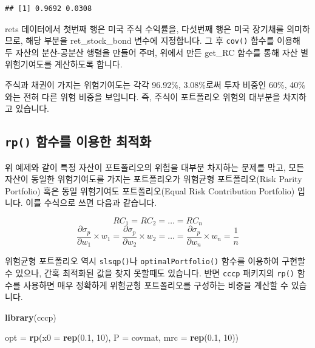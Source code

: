 \documentclass[12pt,]{book}
\newenvironment{Shaded}{\begin{snugshade}}{\end{snugshade}}
\newcommand{\DataTypeTok}[1]{\textcolor[rgb]{0.13,0.29,0.53}{#1}}
\newcommand{\DecValTok}[1]{\textcolor[rgb]{0.00,0.00,0.81}{#1}}
\newcommand{\FloatTok}[1]{\textcolor[rgb]{0.00,0.00,0.81}{#1}}
\newcommand{\KeywordTok}[1]{\textcolor[rgb]{0.13,0.29,0.53}{\textbf{#1}}}
\newcommand{\NormalTok}[1]{#1}
\newcommand{\StringTok}[1]{\textcolor[rgb]{0.31,0.60,0.02}{#1}}
\begin{document}
\begin{verbatim}
## [1] 0.9692 0.0308
\end{verbatim}

rets 데이터에서 첫번째 행은 미국 주식 수익률을, 다섯번째 행은 미국 장기채를 의미하므로, 해당 부분을 ret\_stock\_bond 변수에 지정합니다. 그 후 \texttt{cov()} 함수를 이용해 두 자산의 분산-공분산 행렬을 만들어 주며, 위에서 만든 get\_RC 함수를 통해 자산 별 위험기여도를 계산하도록 합니다.

주식과 채권이 가지는 위험기여도는 각각 96.92\%, 3.08\%로써 투자 비중인 60\%, 40\% 와는 전혀 다른 위험 비중을 보입니다. 즉, 주식이 포트폴리오 위험의 대부분을 차지하고 있습니다.

\hypertarget{rp---}{%
\subsection{\texorpdfstring{\texttt{rp()} 함수를 이용한 최적화}{rp() 함수를 이용한 최적화}}\label{rp---}}

위 예제와 같이 특정 자산이 포트폴리오의 위험을 대부분 차지하는 문제를 막고, 모든 자산이 동일한 위험기여도를 가지는 포트폴리오가 위험균형 포트폴리오(Risk Parity Portfolio) 혹은 동일 위험기여도 포트폴리오(Equal Risk Contribution Portfolio) 입니다. 이를 수식으로 쓰면 다음과 같습니다.

\[RC_1 = RC_2 = \dots = RC_n\]
\[\frac{\partial\sigma_p}{\partial w_1} \times w_1 = \frac{\partial\sigma_p}{\partial w_2} \times w_2
= \dots = \frac{\partial\sigma_p}{\partial w_n} \times w_n = \frac{1}{n}\]

위험균형 포트폴리오 역시 \texttt{slsqp()}나 \texttt{optimalPortfolio()} 함수를 이용하여 구현할 수 있으나, 간혹 최적화된 값을 찾지 못할때도 있습니다. 반면 \texttt{cccp} 패키지의 \texttt{rp()} 함수를 사용하면 매우 정확하게 위험균형 포트폴리오를 구성하는 비중을 계산할 수 있습니다.

\begin{Shaded}
\begin{Highlighting}[]
\KeywordTok{library}\NormalTok{(cccp)}

\NormalTok{opt =}\StringTok{ }\KeywordTok{rp}\NormalTok{(}\DataTypeTok{x0 =} \KeywordTok{rep}\NormalTok{(}\FloatTok{0.1}\NormalTok{, }\DecValTok{10}\NormalTok{),}
         \DataTypeTok{P =}\NormalTok{ covmat,}
         \DataTypeTok{mrc =} \KeywordTok{rep}\NormalTok{(}\FloatTok{0.1}\NormalTok{, }\DecValTok{10}\NormalTok{))}
\end{Highlighting}
\end{Shaded}
\end{document}
